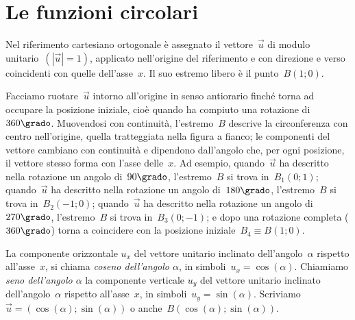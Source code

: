 \vspazio\ovalbox{\risolvii \ref{ese:C.68}, \ref{ese:C.69}, \ref{ese:C.70}, \ref{ese:C.71}, \ref{ese:C.72}, \ref{ese:C.73}, \ref{ese:C.74}}

\section{Le funzioni circolari}

\begin{multicols}{2}
Nel riferimento cartesiano ortogonale è assegnato il vettore~$\vec{u}$ di modulo unitario~$\left(\left|\vec{u}\right|=1\right)$,
applicato nell'origine del riferimento e con direzione e verso coincidenti con quelle dell'asse~$x$. Il suo estremo libero è il punto~$B(1;0)$.

Facciamo ruotare~$\vec{u}$ intorno all'origine in senso antiorario finché torna ad occupare la posizione iniziale,
cioè quando ha compiuto una rotazione di~$360\grado$. Muovendosi con continuità, l'estremo~$B$ descrive la circonferenza con centro
nell'origine, quella tratteggiata nella figura a fianco; le componenti del vettore cambiano con continuità e dipendono dall'angolo che,
per ogni posizione, il vettore stesso forma con l'asse delle~$x$. Ad esempio, quando~$\vec{u}$ ha descritto nella rotazione
un angolo di~$90\grado$, l'estremo~$B$ si trova in~$B_1(0;1)$; quando~$\vec{u}$ ha descritto nella rotazione un angolo di~$180\grado$,
l'estremo~$B$ si trova in~$B_2(-1;0)$; quando~$\vec{u}$ ha descritto nella rotazione un angolo di~$270\grado$, l'estremo~$B$ si trova
in~$B_3(0;-1)$; e dopo una rotazione completa ($360\grado$) torna a coincidere con la posizione iniziale~$B_4{\equiv}B(1;0)$.

\begin{center}
 
\end{center}
\end{multicols}


\begin{definizione}
La componente orizzontale $u_{x}$ del vettore unitario inclinato dell'angolo~$\alpha$ rispetto all'asse~$x$, si chiama \emph{coseno dell'angolo
$\alpha$}, in simboli~$u_{x}=\cos(\alpha)$. Chiamiamo \emph{seno dell'angolo ${\alpha}$} la componente verticale $u_{y}$
del vettore unitario inclinato dell'angolo~${\alpha}$ rispetto all'asse~$x$, in simboli~$u_{y}=\sin(\alpha)$.
Scriviamo~$\vec{u}=(\cos(\alpha);\sin(\alpha))$ o anche~$B(\cos(\alpha);\sin(\alpha))$.
\end{definizione}

